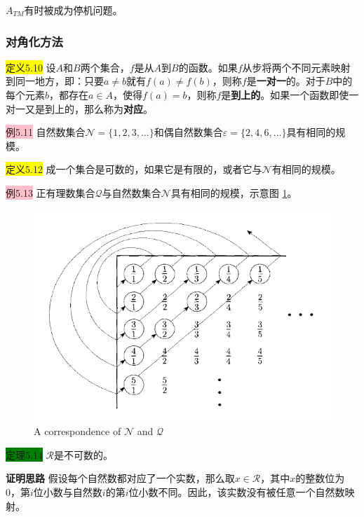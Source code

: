 \documentclass[a4paper]{article}
\begin{document}
	$A_{TM}$有时被成为停机问题。

\subsubsection{对角化方法}

	\colorbox{yellow}{定义5.10} 设$A$和$B$两个集合，$f$是从$A$到$B$的函数。如果$f$从步将两个不同元素映射到同一地方，即：只要$a \neq b$就有$f(a) \neq f(b)$，则称$f$是\textbf{一对一}的。对于$B$中的每个元素$b$，都存在$a \in A$，使得$f(a)=b$，则称$f$是\textbf{到上的}。如果一个函数即使一对一又是到上的，那么称为\textbf{对应}。
	
	\colorbox{pink}{例5.11} 自然数集合$\mathcal{N}=\{1,2,3,\dots\}$和偶自然数集合$\varepsilon=\{2,4,6,\dots\}$具有相同的规模。
	
	\colorbox{yellow}{定义5.12} 成一个集合是可数的，如果它是有限的，或者它与$\mathcal{N}$有相同的规模。

	\colorbox{pink}{例5.13} 正有理数集合$\mathcal{Q}$与自然数集合$\mathcal{N}$具有相同的规模，示意图 \ref{F050201}。
	
	\begin{figure}[htb]
		\centering
		\includegraphics[scale=0.8]{./figure/5.2.1.png}
		\caption{A correspondence of $\mathcal{N}$ and $\mathcal{Q}$}
		\label{F050201}
	\end{figure}
	
	\colorbox{green}{定理5.14} $\mathcal{R}$是不可数的。
	
	\textbf{证明思路} \quad 假设每个自然数都对应了一个实数，那么取$x \in \mathcal{R}$，其中$x$的整数位为0，第$i$位小数与自然数$i$的第$i$位小数不同。因此，该实数没有被任意一个自然数映射。
\end{document}
